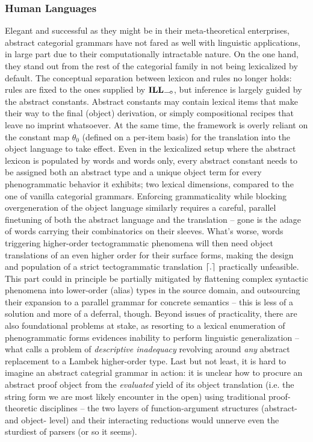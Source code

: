 \subsubsection{Human Languages}
Elegant and successful as they might be in their meta-theoretical enterprises, abstract categorial grammars have not fared as well with linguistic applications, in large part due to their computationally intractable nature.
On the one hand, they stand out from the rest of the categorial family in not being lexicalized by default.
The conceptual separation between lexicon and rules no longer holds: rules are fixed to the ones supplied by $\ILL_{\li}$, but inference is largely guided by the abstract constants.
Abstract constants may contain lexical items that make their way to the final (object) derivation, or simply compositional recipes that leave no imprint whatsoever.
At the same time, the framework is overly reliant on the constant map $\theta_0$ (defined on a per-item basis) for the translation into the object language to take effect.
Even in the lexicalized setup where the abstract lexicon is populated by words and words only, every abstract constant needs to be assigned both an abstract type and a unique object term for every phenogrammatic behavior it exhibits; two lexical dimensions, compared to the one of vanilla categorial grammars.
Enforcing grammaticality while blocking overgeneration of the object language similarly requires a careful, parallel finetuning of both the abstract language and the translation --  gone is the adage of words carrying their combinatorics on their sleeves. 
What's worse, words triggering higher-order tectogrammatic phenomena will then need object translations of an even higher order for their surface forms, making the design and population of a strict tectogrammatic translation $\lceil{.}\rceil$ practically unfeasible.
This part could in principle be partially mitigated by flattening complex syntactic phenomena into lower-order (alias) types in the source domain, and outsourcing their expansion to a parallel grammar for concrete semantics -- this is less of a solution and more of a deferral, though.
Beyond issues of practicality, there are also foundational problems at stake, as resorting to a lexical enumeration of phenogrammatic forms evidences inability to perform linguistic generalization -- what \citet{moot2014hybrid} calls a problem of \textit{descriptive inadequacy} revolving around \textit{any} abstract replacement to a Lambek higher-order type.
Last but not least, it is hard to imagine an abstract categrial grammar in action: it is unclear how to procure an abstract proof object from the \textit{evaluated} yield of its object translation (i.e. the string form we are most likely encounter in the open) using traditional proof-theoretic disciplines -- the two layers of function-argument structures (abstract- and object- level) and their interacting reductions would unnerve even the sturdiest of parsers (or so it seems).

